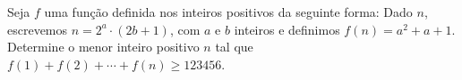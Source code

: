 Seja $f$ uma função definida nos inteiros positivos da seguinte forma:
Dado $n$, escrevemos $n = 2^a \cdot (2b + 1)$, com $a$ e $b$ inteiros e definimos $f(n) = a^2 + a + 1$.
Determine o menor inteiro positivo $n$ tal que $f(1) + f(2) + \cdots + f(n) \ge 123456$.